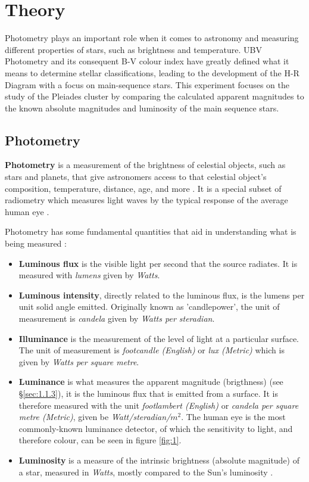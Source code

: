 \documentclass[12pt]{article}
\begin{document}

\section{Theory} \label{sec:1}

Photometry plays an important role when it comes to astronomy and measuring different properties of stars, such as brightness and temperature.
UBV Photometry and its consequent B-V colour index have greatly defined what it means to determine stellar classifications, leading to the development
of the H-R Diagram with a focus on main-sequence stars. This experiment focuses on the study of the Pleiades cluster by comparing the calculated
apparent magnitudes to the known absolute magnitudes and luminosity of the main sequence stars.

\subsection{Photometry} \label{sec:1.1}

\textbf{Photometry} is a measurement of the brightness of celestial objects, such as stars and planets, that give astronomers access to that celestial object's composition,
temperature, distance, age, and more
\cite{britphoto}.
It is a special subset of radiometry which measures light waves by the typical response of the average human eye
\cite{mictechphoto, photophoto}.

Photometry has some fundamental quantities that aid in understanding what is being measured \cite{WYATT197815,photophoto}:

\begin{itemize}
    \item \textbf{Luminous flux} is the visible light per second that the source radiates. It is measured with \textit{lumens} given by \textit{Watts}.
    \item \textbf{Luminous intensity}, directly related to the luminous flux, is the lumens per unit solid angle emitted. Originally known as 'candlepower', the unit of measurement
    is \textit{candela} given by \textit{Watts per steradian}.
    \item \textbf{Illuminance} is the measurement of the level of light at a particular surface. The unit of measurement is \textit{footcandle (English)} or \textit{lux (Metric)} which is
    given by \textit{Watts per square metre}.
    \item \textbf{Luminance} is what measures the apparent magnitude (brigthness) (see §\ref{sec:1.1.3}), it is the luminous flux that is emitted from a surface.
    It is therefore measured with the unit \textit{footlambert (English)} or \textit{candela per square metre (Metric)}, given be \textit{Watt/steradian/}$m^2$.
    The human eye is the most commonly-known luminance detector, of which the sensitivity to light, and therefore colour, can be seen in figure {\ref{fig:1}}.
    \item \textbf{Luminosity} is a measure of the intrinsic brightness (absolute magnitude) of a star, measured in \textit{Watts}, mostly compared to the Sun's luminosity \cite{cosmoslumi}.
\end{itemize}
\end{document}
